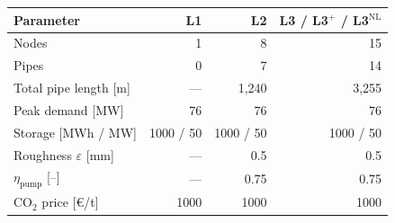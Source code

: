 \begin{tabular}{lrrr}
\toprule
Parameter & L1 & L2 & L3 / L3$^+$ / L3$^\mathrm{NL}$ \\
\midrule
Nodes & 1 & 8 & 15 \\
Pipes & 0 & 7 & 14 \\
Total pipe length [m] & — & 1{,}240 & 3{,}255 \\
Peak demand [MW] & 76 & 76 & 76 \\
Storage [MWh / MW] & 1000 / 50 & 1000 / 50 & 1000 / 50 \\
Roughness $\varepsilon$ [mm] & — & 0.5 & 0.5 \\
$\eta_\mathrm{pump}$ [--] & — & 0.75 & 0.75 \\
CO$_2$ price [\euro/t] & 1000 & 1000 & 1000 \\
\bottomrule
\end{tabular}

